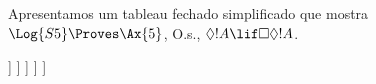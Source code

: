 \documentclass[../../../include/open-logic-section]{subfiles}
\begin{document}
\begin{ex}
  Apresentamos um tableau fechado simplificado que mostra
  $\Log{S5} \Proves \Ax{5}$, O.s.\@, $\Diamond!A \lif \Box\Diamond!A$.
  \begin{oltableau}
    [\pFmla{\False}{\Diamond\formula{A} \lif \Box\Diamond \formula{A}}{1},
      just = \TAss
      [\pFmla{\True}{\Diamond \formula{A}}{1}, just = {\TRule{\False}{\lif}[1]}
        [\pFmla{\False}{\Box\Diamond \formula{A}}{1},
          just = {\TRule{\False}{\lif}[1]}
          [\pFmla{\False}{\Diamond \formula{A}}{2},
            just = {\TRule{\False}{\Box}[3]}
            [\pFmla{\True}{\formula{A}}{3},
              just = {\TRule{\True}{\Diamond}[2]}
                [\pFmla{\False}{\formula{A}}{3},
                  just = {\TRule{\False}{\Diamond}[4]}, close]
            ]
          ]
        ]
      ]
    ]
  \end{oltableau}
\end{ex}
\end{document}
